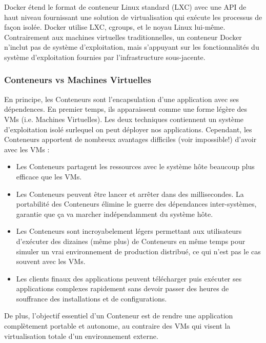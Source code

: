 Docker étend le format de conteneur Linux standard (LXC) avec une API de haut niveau fournissant une solution de virtualisation qui exécute les processus de façon isolée. Docker utilise LXC, cgroups, et le noyau Linux lui-même. Contrairement aux machines virtuelles traditionnelles, un conteneur Docker n'inclut pas de système d'exploitation,  mais s'appuyant sur les fonctionnalités du système d’exploitation fournies par l'infrastructure sous-jacente.

\subsubsection{Conteneurs vs Machines Virtuelles}
En principe, les Conteneurs sont l'encapsulation d'une application avec ses dépendences. En premier temps, ils apparaissent comme une forme légère des VMs (i.e. Machines Virtuelles). Les deux techniques contiennent un système d'exploitation isolé surlequel on peut déployer nos applications. Cependant, les Conteneurs apportent de nombreux avantages difficiles (voir impossible!) d'avoir avec les VMs :
\begin{itemize}
\item Les Conteneurs partagent les ressources avec le système hôte beaucoup plus efficace que les VMs. 
\item Les Conteneurs peuvent être lancer et arrêter dans des millisecondes. 
La portabilité des Conteneurs élimine le guerre des dépendances inter-systèmes, garantie que ça va marcher indépendamment du système hôte. 
\item Les Conteneurs sont incroyabelement légers permettant aux utilisateurs d'exécuter des dizaines (même plus) de Conteneurs en même temps pour simuler un vrai environnement de production distribué, ce qui n'est pas le cas souvent avec les VMs. 
\item Les clients finaux des applications peuvent télécharger puis exécuter ses applications complexes rapidement sans devoir passer des heures de souffrance des installations et de configurations. 
\newline
\end{itemize}

De plus, l'objectif essentiel d'un Conteneur est de rendre une application complètement portable et autonome, au contraire des VMs qui visent la virtualisation totale d'un environnement externe.

